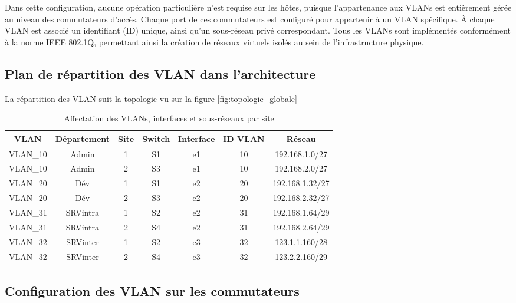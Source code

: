 \documentclass[12pt,a4paper, oneside]{memoir}
\begin{document}
Dans cette configuration, aucune opération particulière n’est requise sur les hôtes, puisque l’appartenance aux VLANs est entièrement gérée au niveau des commutateurs d’accès. Chaque port de ces commutateurs est configuré pour appartenir à un VLAN spécifique. À chaque VLAN est associé un identifiant (ID) unique, ainsi qu’un sous-réseau privé correspondant. Tous les VLANs sont implémentés conformément à la norme IEEE 802.1Q, permettant ainsi la création de réseaux virtuels isolés au sein de l’infrastructure physique.

\subsection{Plan de répartition des VLAN dans l’architecture}
La répartition des VLAN suit la topologie vu sur la figure  \ref{fig:topologie_globale}
\begin{table}[H]
	\centering
	\caption{Affectation des VLANs, interfaces et sous-réseaux par site}
	\label{tab:vlans}
	\renewcommand{\arraystretch}{1.2}
	\begin{tabular}{|c|c|c|c|c|c|c|}
		\hline
		\textbf{VLAN} & \textbf{Département} & \textbf{Site} & \textbf{Switch} & \textbf{Interface} & \textbf{ID VLAN} & \textbf{Réseau} \\
		\hline
		VLAN\_10 & Admin    & 1 & S1 & e1 & 10 & 192.168.1.0/27 \\
		VLAN\_10 & Admin    & 2 & S3 & e1 & 10 & 192.168.2.0/27 \\
		\hline
		\hline
		VLAN\_20 & Dév     & 1 & S1 & e2 & 20 & 192.168.1.32/27 \\
		VLAN\_20 & Dév     & 2 & S3 & e2 & 20 & 192.168.2.32/27 \\
		\hline
		\hline
		VLAN\_31 & SRVintra     & 1 & S2 & e2 & 31 & 192.168.1.64/29 \\
		VLAN\_31 & SRVintra     & 2 & S4 & e2 & 31 & 192.168.2.64/29 \\
		\hline
		\hline
		VLAN\_32 & SRVinter     & 1 & S2 & e3 & 32 & 123.1.1.160/28 \\
		VLAN\_32 & SRVinter     & 2 & S4 & e3 & 32 & 123.2.2.160/29 \\
		\hline
	\end{tabular}
\end{table}

\subsection{Configuration des VLAN sur les commutateurs}
\end{document}
